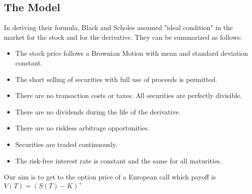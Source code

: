 \documentclass[paper=a4, fontsize=12pt]{scrartcl} %
\numberwithin{equation}{section}
\begin{document}
\subsection{The Model}
In deriving their formula, Black and Scholes \cite{black-scholes} assumed "ideal condition" in the market for the stock and for the derivative. They can be summarized as follows:
	\begin{itemize}
		\item The stock price follows a Brownian Motion with mean and standard deviation constant.
		\item The short selling of securities with full use of proceeds is permitted.
		\item There are no transaction costs or taxes. All securities are perfectly divisible.
		\item There are no dividends during the life of the derivative.
		\item There are no riskless arbitrage opportunities.
		\item Securities are traded continuously.
		\item The risk-free interest rate is constant and the same for all maturities.
	\end{itemize}
Our aim is to get to the option price of a European call which payoff is $V(T) = (S(T) - K)^+$
\end{document}

